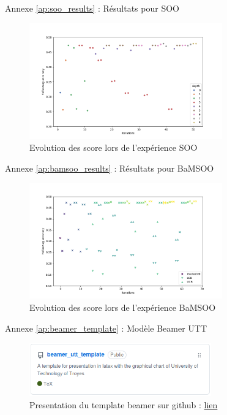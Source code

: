 \begin{frame}{Annexe \ref{ap:soo_results} : Résultats pour SOO}
    \label{ap:soo_results}
    \begin{figure}
        \centering
        \includegraphics[height = 5cm]{assets/imgs/plots/soo/score_evolution.png}
        \caption{Evolution des score lors de l'expérience SOO}
    \end{figure} 
\end{frame}

\begin{frame}{Annexe \ref{ap:bamsoo_results} : Résultats pour BaMSOO}
    \label{ap:bamsoo_results}
    \begin{figure}
        \centering
        \includegraphics[height = 5cm]{assets/imgs/plots/bamsoo/score_evolution.png}
        \caption{Evolution des score lors de l'expérience BaMSOO}
    \end{figure} 
\end{frame}

\begin{frame}{Annexe \ref{ap:beamer_template} : Modèle Beamer UTT}
    \label{ap:beamer_template}
    \begin{figure}
        \centering
        \includegraphics[width = 0.7\textwidth]{assets/annexes/beamer_gh_screenshot.png}
        \caption{Presentation du template beamer sur github : \href{https://github.com/Kiwy3/beamer_utt_template}{lien} }
    \end{figure} 
\end{frame}
